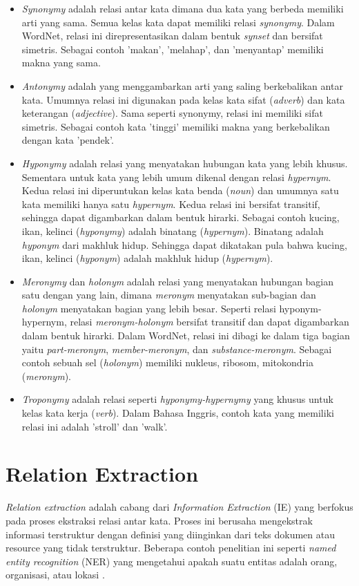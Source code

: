 \begin{itemize}
  \item \textit{Synonymy} adalah relasi antar kata dimana dua kata yang berbeda memiliki arti yang sama. Semua kelas kata dapat memiliki relasi \textit{synonymy}. Dalam WordNet, relasi ini direpresentasikan dalam bentuk \textit{synset} dan bersifat simetris. Sebagai contoh 'makan', 'melahap', dan 'menyantap' memiliki makna yang sama.
  \item \textit{Antonymy} adalah yang menggambarkan arti yang saling berkebalikan antar kata. Umumnya relasi ini digunakan pada kelas kata sifat (\textit{adverb}) dan kata keterangan (\textit{adjective}). Sama seperti synonymy, relasi ini memiliki sifat simetris. Sebagai contoh kata 'tinggi' memiliki makna yang berkebalikan dengan kata 'pendek'.
  \item \textit{Hyponymy} adalah relasi yang menyatakan hubungan kata yang lebih khusus. Sementara untuk kata yang lebih umum dikenal dengan relasi \textit{hypernym}. Kedua relasi ini diperuntukan kelas kata benda (\textit{noun}) dan umumnya satu kata memiliki hanya satu \textit{hypernym}. Kedua relasi ini bersifat transitif, sehingga dapat digambarkan dalam bentuk hirarki. Sebagai contoh kucing, ikan, kelinci (\textit{hyponymy}) adalah binatang (\textit{hypernym}). Binatang adalah \textit{hyponym} dari makhluk hidup. Sehingga dapat dikatakan pula bahwa kucing, ikan, kelinci (\textit{hyponym}) adalah makhluk hidup (\textit{hypernym}).
  \item \textit{Meronymy} dan \textit{holonym} adalah relasi yang menyatakan hubungan bagian satu dengan yang lain, dimana \textit{meronym} menyatakan sub-bagian dan \textit{holonym} menyatakan bagian yang lebih besar. Seperti relasi hyponym-hypernym, relasi \textit{meronym-holonym} bersifat transitif dan dapat digambarkan dalam bentuk hirarki. Dalam WordNet, relasi ini dibagi ke dalam tiga bagian yaitu \textit{part-meronym}, \textit{member-meronym}, dan \textit{substance-meronym}. Sebagai contoh sebuah sel (\textit{holonym}) memiliki nukleus, ribosom, mitokondria (\textit{meronym}).
  \item \textit{Troponymy} adalah relasi seperti \textit{hyponymy-hypernymy} yang khusus untuk kelas kata kerja (\textit{verb}). Dalam Bahasa Inggris, contoh kata yang memiliki relasi ini adalah 'stroll' dan 'walk'.
\end{itemize}


\section{Relation Extraction}
\textit{Relation extraction} adalah cabang dari \textit{Information Extraction} (IE) yang berfokus pada proses ekstraksi relasi antar kata. Proses ini berusaha mengekstrak informasi terstruktur dengan definisi yang diinginkan dari teks dokumen atau resource yang tidak terstruktur. Beberapa contoh penelitian ini seperti \textit{named entity recognition} (NER) yang mengetahui apakah suatu entitas adalah orang, organisasi, atau lokasi \citep{bikel1999algorithm}. 

